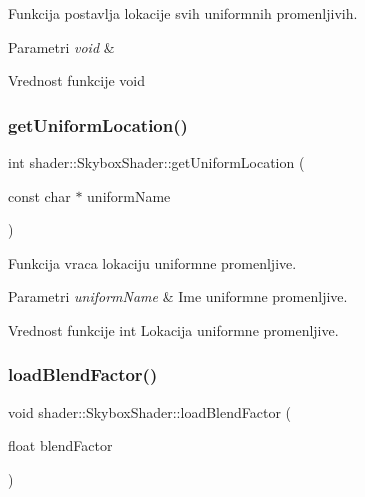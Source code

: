 Funkcija postavlja lokacije svih uniformnih promenljivih. 


\begin{DoxyParams}{Parametri}
{\em void} & \\
\hline
\end{DoxyParams}
\begin{DoxyReturn}{Vrednost funkcije}
void 
\end{DoxyReturn}
\mbox{\label{classshader_1_1SkyboxShader_a4a253cd426b56b9a7cd2e232dfc34ef6}} 
\subsubsection{\texorpdfstring{get\+Uniform\+Location()}{getUniformLocation()}}
{\footnotesize\ttfamily int shader\+::\+Skybox\+Shader\+::get\+Uniform\+Location (\begin{DoxyParamCaption}\item[{const char $\ast$}]{uniform\+Name }\end{DoxyParamCaption})}



Funkcija vraca lokaciju uniformne promenljive. 


\begin{DoxyParams}{Parametri}
{\em uniform\+Name} & Ime uniformne promenljive. \\
\hline
\end{DoxyParams}
\begin{DoxyReturn}{Vrednost funkcije}
int Lokacija uniformne promenljive. 
\end{DoxyReturn}
\mbox{\label{classshader_1_1SkyboxShader_a7f82a4e1c953df83dddb6760c83742a1}} 
\subsubsection{\texorpdfstring{load\+Blend\+Factor()}{loadBlendFactor()}}
{\footnotesize\ttfamily void shader\+::\+Skybox\+Shader\+::load\+Blend\+Factor (\begin{DoxyParamCaption}\item[{float}]{blend\+Factor }\end{DoxyParamCaption})}



